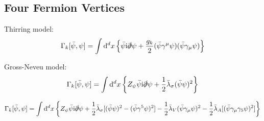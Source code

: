 	\subsection{Four Fermion Vertices}
		Thirring model:
		\begin{equation}
			\Gamma_k[\bar{\psi},\psi] = \int\dd[d]{x} \qty{\bar{\psi} \mathrm{i}\slashed{\partial} \psi + \frac{g_k}{2} (\bar{\psi} \gamma^\mu \psi) (\bar{\psi} \gamma_\mu \psi)}
		\end{equation}

		\noindent
		Gross-Neveu model:
		\begin{equation}
			\Gamma_k[\bar{\psi},\psi] = \int \dd[d]{x} \qty{Z_\psi \bar{\psi} \mathrm{i}\slashed{\partial} \psi + \frac{1}{2} \bar{\lambda}_\sigma(\bar{\psi} \psi)^2}
		\end{equation}

		\begin{equation}
			\Gamma_k[\bar{\psi},\psi] = \int \dd[d]{x} \qty{ Z_\psi \bar{\psi} \mathrm{i}\slashed{\partial} \psi + \frac{1}{2} \bar{\lambda}_\sigma[(\bar{\psi} \psi)^2 - (\bar{\psi} \gamma^5 \psi)^2] - \frac{1}{2} \bar{\lambda}_V (\bar{\psi} \gamma_{\mu} \psi)^2 - \frac{1}{2} \bar{\lambda}_A[(\bar{\psi} \gamma_{\mu} \gamma_5 \psi)^2]}
		\end{equation}